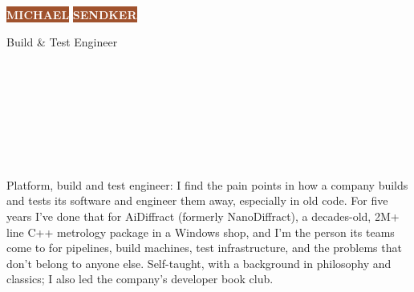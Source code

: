 \documentclass[9pt]{developercv} %
\begin{document}
\pagestyle{empty} %


\begin{minipage}[t]{0.45\textwidth} %
    \vspace{-\baselineskip} %
    \colorbox{Sienna}{{\HUGE\textcolor{white}{\textbf{\MakeUppercase{Michael}}}}} %
    \colorbox{Sienna}{{\HUGE\textcolor{white}{\textbf{\MakeUppercase{Sendker}}}}} %

    \vspace{6pt}

    {\huge Build \& Test Engineer} %
\end{minipage}
\begin{minipage}[t]{0.275\textwidth} %
    \vspace{-\baselineskip} %
    \href{mailto:m@standingwater.io}{}\\
    \\
    \href{tel:+1727-272-3915}{}\\
\end{minipage}
\begin{minipage}[t]{0.275\textwidth} %
    \vspace{-\baselineskip} %
    \href{https://linkedin.com/in/michael-sendker}{}\\
    \href{https://standingwater.io}{}\\
    \href{https://github.com/mas-4}{}\\
\end{minipage}



\bodyfont
Platform, build and test engineer: I find the pain points in how a company builds and tests its
software and engineer them away, especially in old code. For five years I've done
that for AiDiffract (formerly NanoDiffract), a decades-old, 2M+ line C++ metrology package in a Windows shop, and I'm the
person its teams come to for pipelines, build machines, test infrastructure, and the problems that
don't belong to anyone else. Self-taught, with a background in philosophy and classics; I also led the company's developer book club.
\end{document}
